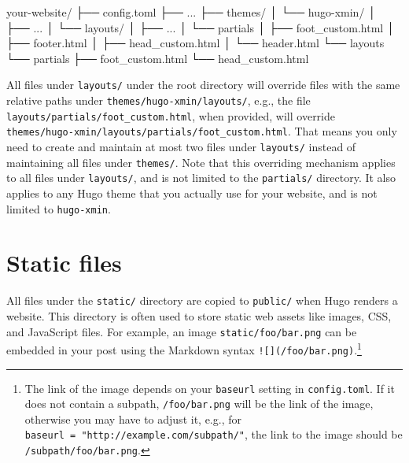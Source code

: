 \documentclass[12pt,]{krantz}
\makeatletter
\newenvironment{Shaded}{\begin{snugshade}}{\end{snugshade}}
\newcommand{\ExtensionTok}[1]{#1}
\newcommand{\NormalTok}[1]{#1}
\newenvironment{kframe}{%
\medskip{}
\setlength{\fboxsep}{.8em}
 \def\at@end@of@kframe{}%
 \ifinner\ifhmode%
  \def\at@end@of@kframe{\end{minipage}}%
  \begin{minipage}{\columnwidth}%
 \fi\fi%
 \def\FrameCommand##1{\hskip\@totalleftmargin \hskip-\fboxsep
 \colorbox{shadecolor}{##1}\hskip-\fboxsep
     \hskip-\linewidth \hskip-\@totalleftmargin \hskip\columnwidth}%
 \MakeFramed {\advance\hsize-\width
   \@totalleftmargin\z@ \linewidth\hsize
   \@setminipage}}%
 {\par\unskip\endMakeFramed%
 \at@end@of@kframe}
\renewenvironment{Shaded}{\begin{kframe}}{\end{kframe}}
\theoremstyle{definition}
\theoremstyle{definition}
\theoremstyle{definition}
\theoremstyle{remark}
\makeatother
\begin{document}
\begin{Shaded}
\begin{Highlighting}[]
\ExtensionTok{your-website/}
\NormalTok{├── }\ExtensionTok{config.toml}
\NormalTok{├── }\ExtensionTok{...}
\NormalTok{├── }\ExtensionTok{themes/}
\NormalTok{│   └── }\ExtensionTok{hugo-xmin/}
\NormalTok{│       ├── }\ExtensionTok{...}
\NormalTok{│       └── }\ExtensionTok{layouts/}
\NormalTok{│           ├── }\ExtensionTok{...}
\NormalTok{│           └── }\ExtensionTok{partials}
\NormalTok{│               ├── }\ExtensionTok{foot_custom.html}
\NormalTok{│               ├── }\ExtensionTok{footer.html}
\NormalTok{│               ├── }\ExtensionTok{head_custom.html}
\NormalTok{│               └── }\ExtensionTok{header.html}
\NormalTok{└── }\ExtensionTok{layouts}
\NormalTok{    └── }\ExtensionTok{partials}
\NormalTok{        ├── }\ExtensionTok{foot_custom.html}
\NormalTok{        └── }\ExtensionTok{head_custom.html}
\end{Highlighting}
\end{Shaded}

All files under \texttt{layouts/} under the root directory will override
files with the same relative paths under
\texttt{themes/hugo-xmin/layouts/}, e.g., the file
\texttt{layouts/partials/foot\_custom.html}, when provided, will
override \texttt{themes/hugo-xmin/layouts/partials/foot\_custom.html}.
That means you only need to create and maintain at most two files under
\texttt{layouts/} instead of maintaining all files under
\texttt{themes/}. Note that this overriding mechanism applies to all
files under \texttt{layouts/}, and is not limited to the
\texttt{partials/} directory. It also applies to any Hugo theme that you
actually use for your website, and is not limited to \texttt{hugo-xmin}.

\section{Static files}\label{static-files}

All files under the \texttt{static/} directory
are copied to \texttt{public/} when Hugo renders a website. This
directory is often used to store static web assets like images, CSS, and
JavaScript files. For example, an image \texttt{static/foo/bar.png} can
be embedded in your post using the Markdown syntax
\texttt{!{[}{]}(/foo/bar.png)}.\footnote{The link of the image depends
  on your \texttt{baseurl} setting in \texttt{config.toml}. If it does
  not contain a subpath, \texttt{/foo/bar.png} will be the link of the
  image, otherwise you may have to adjust it, e.g., for
  \texttt{baseurl\ =\ "http://example.com/subpath/"}, the link to the
  image should be \texttt{/subpath/foo/bar.png}.}
\end{document}
